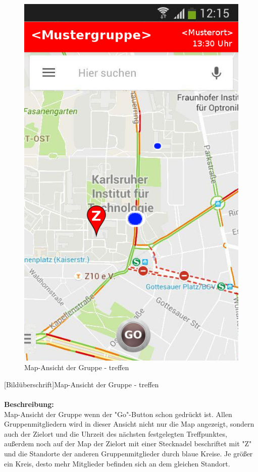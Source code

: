 \begin{figure}
	\caption{Map-Ansicht der Gruppe - treffen}
\begin{center}
	\includegraphics[scale =0.5]{resources/images/map_Go.png}
\end{center}
\end{figure}
[Bildüberschrift]Map-Ansicht der Gruppe - treffen\\ \\
\textbf{Beschreibung:}\\
Map-Ansicht der Gruppe wenn der "Go"-Button schon gedrückt ist. Allen Gruppenmitgliedern wird in dieser Ansicht nicht nur die Map angezeigt, sondern auch der Zielort und die Uhrzeit des nächsten festgelegten Treffpunktes, außerdem noch auf der Map der Zielort mit einer Stecknadel beschriftet mit "Z" und die Standorte der anderen Gruppenmitglieder durch blaue Kreise. Je größer ein Kreis, desto mehr Mitglieder befinden sich an dem gleichen Standort.\\
